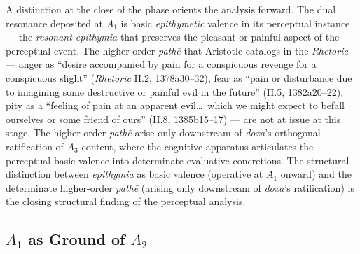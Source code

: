 \documentclass{article}
\begin{document}
A distinction at the close of the phase orients the analysis forward. The dual resonance deposited at $A_1$ is basic \textit{epithymetic} valence in its perceptual instance --- the \textit{resonant epithymia} that preserves the pleasant-or-painful aspect of the perceptual event. The higher-order \textit{pathē} that Aristotle catalogs in the \textit{Rhetoric} --- anger as ``desire accompanied by pain for a conspicuous revenge for a conspicuous slight'' (\textit{Rhetoric} II.2, 1378a30--32), fear as ``pain or disturbance due to imagining some destructive or painful evil in the future'' (II.5, 1382a20--22), pity as a ``feeling of pain at an apparent evil\ldots\ which we might expect to befall ourselves or some friend of ours'' (II.8, 1385b15--17) --- are not at issue at this stage. The higher-order \textit{pathē} arise only downstream of \textit{doxa}'s orthogonal ratification of $A_3$ content, where the cognitive apparatus articulates the perceptual basic valence into determinate evaluative concretions. The structural distinction between \textit{epithymia} as basic valence (operative at $A_1$ onward) and the determinate higher-order \textit{pathē} (arising only downstream of \textit{doxa}'s ratification) is the closing structural finding of the perceptual analysis.

\subsection{$A_1$ as Ground of $A_2$}
\end{document}
